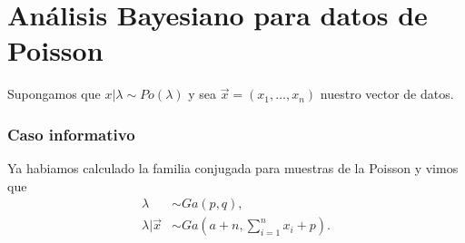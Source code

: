 \section{Análisis Bayesiano para datos de Poisson}
\noindent Supongamos que $x | \lambda \sim Po(\lambda)$ y sea $\vec{x} = (x_1, \ldots, x_n)$ nuestro vector de datos.

\subsubsection{Caso informativo}
\noindent Ya habiamos calculado la familia conjugada para muestras de la Poisson y vimos que
\begin{align*}
    \lambda &\sim Ga(p,q), \\
    \lambda | \vec{x} &\sim Ga\left( a+ n, \sum_{i=1}^{n} x_i + p \right).
\end{align*}

